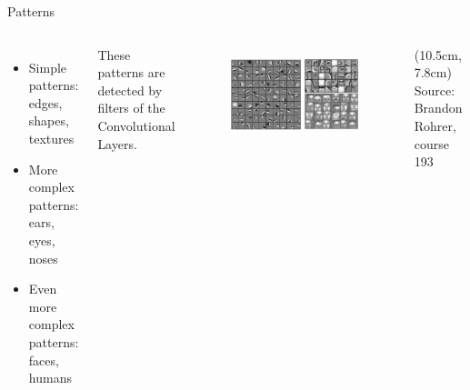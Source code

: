 \documentclass[citestyle=authoryear,bibstyle=numeric,hyperref,backend=biber]{sdqbeamer}
\begin{document}
\begin{frame}{Patterns}
\begin{columns}
    \begin{itemize}
       \item Simple patterns: edges, shapes, textures
       \item More complex patterns: ears, eyes, noses
       \item Even more complex patterns: faces, humans
    \end{itemize}
    These patterns are detected by filters of the Convolutional Layers.
    \begin{figure}
        \centering
        \includegraphics[width=1\textwidth]{pictures/cnn18.png}
        \label{fig:enter-label}
    \end{figure}
    \begin{textblock*}{6cm}(10.5cm, 7.8cm) %
        \tiny{Source: Brandon Rohrer, course 193}
    \end{textblock*}
\end{columns}
\end{frame}
\end{document}
